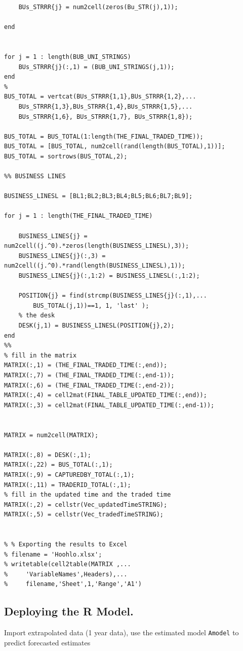 \documentclass{DissertateUSU}
\begin{document}
\begin{verbatim}
    BUs_STRRR{j} = num2cell(zeros(Bu_STR(j),1));
    
end


for j = 1 : length(BUB_UNI_STRINGS)
    BUs_STRRR{j}(:,1) = (BUB_UNI_STRINGS(j,1));
end
%
BUS_TOTAL = vertcat(BUs_STRRR{1,1},BUs_STRRR{1,2},...
    BUs_STRRR{1,3},BUs_STRRR{1,4},BUs_STRRR{1,5},...
    BUs_STRRR{1,6}, BUs_STRRR{1,7}, BUs_STRRR{1,8});

BUS_TOTAL = BUS_TOTAL(1:length(THE_FINAL_TRADED_TIME));
BUS_TOTAL = [BUS_TOTAL, num2cell(rand(length(BUS_TOTAL),1))];
BUS_TOTAL = sortrows(BUS_TOTAL,2);

%% BUSINESS LINES

BUSINESS_LINESL = [BL1;BL2;BL3;BL4;BL5;BL6;BL7;BL9];

for j = 1 : length(THE_FINAL_TRADED_TIME)
    
    BUSINESS_LINES{j} = num2cell((j.^0).*zeros(length(BUSINESS_LINESL),3));
    BUSINESS_LINES{j}(:,3) = num2cell((j.^0).*rand(length(BUSINESS_LINESL),1));
    BUSINESS_LINES{j}(:,1:2) = BUSINESS_LINESL(:,1:2);
    
    POSITION{j} = find(strcmp(BUSINESS_LINES{j}(:,1),...
        BUS_TOTAL(j,1))==1, 1, 'last' );
    % the desk
    DESK(j,1) = BUSINESS_LINESL(POSITION{j},2);
end
%%
% fill in the matrix
MATRIX(:,1) = (THE_FINAL_TRADED_TIME(:,end));
MATRIX(:,7) = (THE_FINAL_TRADED_TIME(:,end-1));
MATRIX(:,6) = (THE_FINAL_TRADED_TIME(:,end-2));
MATRIX(:,4) = cell2mat(FINAL_TABLE_UPDATED_TIME(:,end));
MATRIX(:,3) = cell2mat(FINAL_TABLE_UPDATED_TIME(:,end-1));


MATRIX = num2cell(MATRIX);

MATRIX(:,8) = DESK(:,1);
MATRIX(:,22) = BUS_TOTAL(:,1);
MATRIX(:,9) = CAPTUREDBY_TOTAL(:,1);
MATRIX(:,11) = TRADERID_TOTAL(:,1);
% fill in the updated time and the traded time
MATRIX(:,2) = cellstr(Vec_updatedTimeSTRING);
MATRIX(:,5) = cellstr(Vec_tradedTimeSTRING);


% % Exporting the results to Excel
% filename = 'Hoohlo.xlsx';
% writetable(cell2table(MATRIX ,...
%     'VariableNames',Headers),...
%     filename,'Sheet',1,'Range','A1')
\end{verbatim}

\normalsize

\subsection{Deploying the R Model.}

Import extrapolated data (1 year data), use the estimated model
\texttt{Amodel} to predict forecasted estimates
\end{document}
